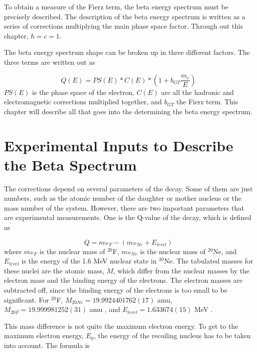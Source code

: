 \documentclass[../MaxHughesThesis.tex]{subfiles}
\begin{document}
To obtain a measure of the Fierz term, the beta energy spectrum must be precisely described.
The description of the beta energy spectrum is written as a series of corrections multiplying the main phase space factor.  
Through out this chapter, $\hbar = c = 1$.

The beta energy spectrum shape can be broken up in three different factors. 
The three terms are written out as  %

\begin{equation}
	Q(E) = PS(E) * C(E) * (1 + b_{GT}\frac{m_{e}}{E})
	\label{eq:betaspectrum}
\end{equation}
$PS(E)$ is the phase space of the electron, $C(E)$ are all the hadronic and electromagnetic corrections multiplied together, and $b_{GT}$ the Fierz term.
This chapter will describe all that goes into the determining the beta energy spectrum.

\section{Experimental Inputs to Describe the Beta Spectrum}
The corrections depend on several parameters of the decay. 
Some of them are just numbers, such as the atomic number of the daughter or mother nucleus or the mass number of the system.
However, there are two important parameters that are experimental measurements.
One is the Q-value of the decay, which is defined as %

\begin{equation}
	Q = m_{^{20}F} - (m_{^{20}Ne} + E_{level})
	\label{eq:qval}
\end{equation} 
where $m_{^{20}F}$ is the nuclear mass of $^{20}$F, $m_{^{20}Ne}$ is the nuclear mass of $^{20}$Ne, and $E_{level}$ is the energy of the 1.6 MeV nuclear state in $^{20}$Ne. 
The tabulated masses for these nuclei are the atomic mass, $M$, which differ from the nuclear masses by the electron mass and the binding energy of the electrons.
The electron masses are subtracted off, since the binding energy of the electrons is too small to be significant.
For $^{20}$F, $M_{20Ne} = 19.9924401762 (17)$ amu, $M_{20F} = 19.999981252 (31) $ amu \cite{Wan17} , and $E_{level} = 1.633674 (15)$ MeV  \cite{Til98}   .

This mass difference is not quite the maximum electron energy. 
To get to the maximum electron energy, $E_{0}$, the energy of the recoiling nucleus has to be taken into account.
The formula is \cite{Hol74}%
\end{document}
